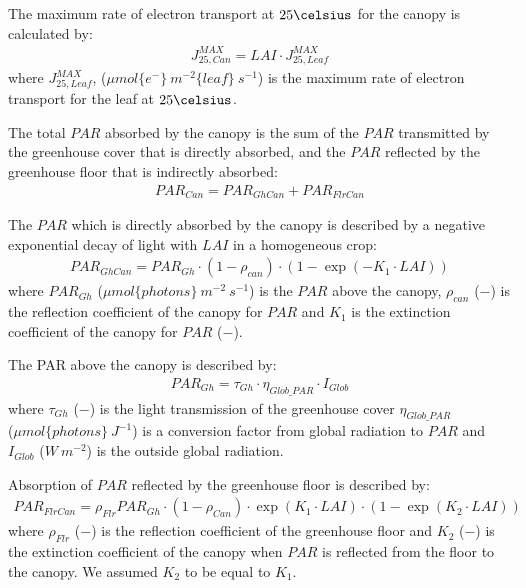 \documentclass[a4paper]{article}
\numberwithin{equation}{section}
\begin{document}
The maximum rate of electron transport at \(25 \celsius\) for the canopy is calculated by:
\begin{align}
  J^{MAX}_{25,Can} = LAI \cdot J^{MAX}_{25,Leaf}
\end{align}
where \(J^{MAX}_{25,Leaf}\), (\(\mu mol\{e^-\}\ m^{-2}\{leaf\}\ s^{-1}\)) is the maximum rate of electron transport for the leaf at \(25 \celsius\).

The total \(PAR\) absorbed by the canopy is the sum of the \(PAR\) transmitted by the greenhouse cover that is directly absorbed, and the \(PAR\) reflected by the greenhouse floor that is indirectly absorbed:
\begin{align}
  PAR_{Can} = PAR_{GhCan} + PAR_{FlrCan}
\end{align}

The \(PAR\) which is directly absorbed by the canopy is described by a negative exponential decay of light with \(LAI\) in a homogeneous crop:
\begin{align}
  PAR_{GhCan} = PAR_{Gh}\cdot (1-\rho_{can})\cdot(1 - \exp \left(-K_1\cdot LAI\right))
\end{align}
where \(PAR_{Gh}\) (\(\mu mol \{photons\}\ m^{-2}\ s^{-1}\)) is the \(PAR\) above the canopy, \(\rho_{can}\) (\(-\)) is the reflection coefficient of the canopy for \(PAR\) and \(K_1\) is the extinction coefficient of the canopy for \(PAR\) (\(-\)).

The PAR above the canopy is described by:
\begin{align}
  PAR_{Gh} = \tau_{Gh} \cdot \eta_{Glob\_PAR}\cdot I_{Glob}
\end{align}
where \(\tau_{Gh}\) (\(-\)) is the light transmission of the greenhouse cover \(\eta_{Glob\_PAR}\) \\    (\(\mu mol\{photons\}\ J^{-1}\)) is a conversion factor from global radiation to \(PAR\) and \(I_{Glob}\) (\(W\ m^{-2}\)) is the outside global radiation.

Absorption of \(PAR\) reflected by the greenhouse floor is described by:
\begin{align}
  PAR_{FlrCan} = \rho_{Flr}PAR_{Gh}\cdot (1-\rho_{Can})\cdot \exp \left(K_1\cdot LAI\right) \cdot (1 - \exp \left(K_2\cdot LAI\right))
\end{align}
where \(\rho_{Flr}\) (\(-\)) is the reflection coefficient of the greenhouse floor and \(K_2\) (\(-\)) is the extinction coefficient of the canopy when \(PAR\) is reflected from the floor to the canopy. We assumed \(K_2\) to be equal to \(K_1\).
\end{document}
